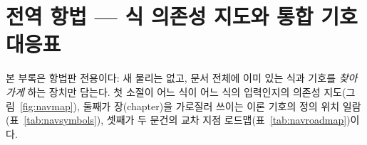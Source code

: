 \section{전역 항법 --- 식 의존성 지도와 통합 기호 대응표}\label{sec:appendix-nav}
본 부록은 항법판 전용이다: 새 물리는 없고, 문서 전체에 이미 있는 식과 기호를 \emph{찾아가게} 하는
장치만 담는다. 첫 소절이 어느 식이 어느 식의 입력인지의 의존성 지도(그림~\ref{fig:navmap}), 둘째가
장(chapter)을 가로질러 쓰이는 이론 기호의 정의 위치 일람(표~\ref{tab:navsymbols}), 셋째가 두 문건의
교차 지점 로드맵(표~\ref{tab:navroadmap})이다.

